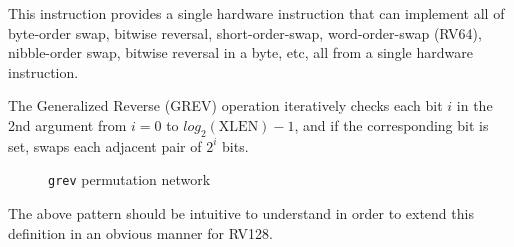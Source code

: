 This instruction provides a single hardware instruction that can implement all
of byte-order swap, bitwise reversal, short-order-swap, word-order-swap
(RV64), nibble-order swap, bitwise reversal in a byte, etc, all from a single
hardware instruction.

The Generalized Reverse (GREV) operation iteratively checks each bit $i$ in the
2nd argument from $i=0$ to $log_2(\textrm{XLEN})-1$, and if the corresponding bit is
set, swaps each adjacent pair of $2^i$ bits.

\begin{figure}[t]
\begin{center}

\end{center}
\caption{\texttt{grev} permutation network}
\label{permnet-grev}
\end{figure}



The above pattern should be intuitive to understand in order to extend
this definition in an obvious manner for RV128.

